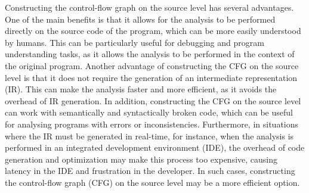 Constructing the control-flow graph on the source level has several advantages.
One of the main benefits is that it allows for the analysis to be performed directly
on the source code of the program, which can be more easily understood by humans.
This can be particularly useful for debugging and program understanding tasks,
as it allows the analysis to be performed in the context of the original program.
Another advantage of constructing the CFG on the source level is that it does not
require the generation of an intermediate representation (IR). This can make the
analysis faster and more efficient, as it avoids the overhead of IR generation.
In addition, constructing the CFG on the source level can work with semantically
and syntactically broken code, which can be useful for analysing programs with
errors or inconsistencies.
Furthermore, in situations where the IR must be generated in real-time,
for instance, when the analysis is performed in an integrated development environment (IDE),
the overhead of code generation and optimization may make this process too expensive,
causing latency in the IDE and frustration in the developer.
In such cases, constructing the control-flow graph (CFG) on the source level
may be a more efficient option.

